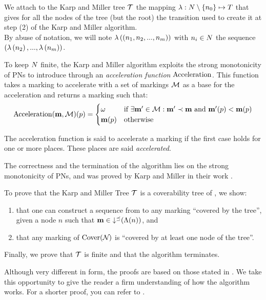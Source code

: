 We attach to the Karp and Miller tree $\mathcal{T}$ the mapping $\operatorname{\lambda} : N \setminus \{n_0\} \mapsto T$ that gives for all the nodes of the tree (but the root) the transition used to create it at step (2) of the Karp and Miller algorithm.\\
By abuse of notation, we will note
$\operatorname{\lambda}\left({(n_1, n_2, ..., n_m)}\right)$
with $n_i \in N$
the sequence
\\
$(\operatorname{\lambda}\left({n_2}\right), ..., \operatorname{\lambda}\left({n_m}\right))$.

To keep $N$ finite, the Karp and Miller algorithm exploits the strong monotonicity of \acp{PN} to introduce \omarks through an \emph{acceleration function} $\operatorname{Acceleration}$.
This function takes a marking \mar to accelerate with a set of markings $\mathcal{M}$ as a base for the acceleration and returns a marking such that:
\[
  \operatorname{Acceleration}(\mathbf{m},\mathcal{M})(p) =
  \begin{cases}
    \omega  &\text{if } \exists \mathbf{m}' \in \mathcal{M} : \mathbf{m}' \prec \mathbf{m} \text{ and } \mathbf{m}'(p) < \mathbf{m}(p) \\
    \mathbf{m}(p) &\text{otherwise}
  \end{cases}
\]

The acceleration function is said to accelerate a marking if the first case holds for one or more places.
These places are said \emph{accelerated}.

The correctness and the termination of the algorithm lies on the strong monotonicity of \acp{PN}, and was proved by Karp and Miller in their work \cite{Karp69}.

To prove that the Karp and Miller Tree $\mathcal{T}$ is a coverability tree of \namePN, we show:
\begin{enumerate}
  \item that one can construct a sequence from \mari to any marking \mar “covered by the tree”, given a node $n$ such that $\mathbf{m} \in \operatorname{\downarrow^\preceq}(\operatorname{\Lambda}(n))$, and
  \item that any marking of $\operatorname{Cover}(\mathcal{N}_{})$ is “covered by at least one node of the tree”.
\end{enumerate}

Finally, we prove that $\mathcal{T}$ is finite and that the algorithm terminates.

Although very different in form, the proofs are based on those stated in \cite{Karp69}.
We take this opportunity to give the reader a firm understanding of how the algorithm works.
For a shorter proof, you can refer to \cite{Karp69}.

